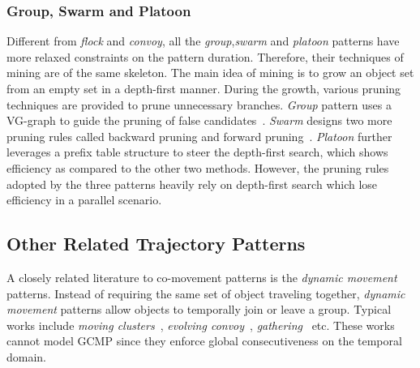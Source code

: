 \subsubsection{Group, Swarm and Platoon}
Different from \emph{flock} and \emph{convoy}, all the \emph{group},\emph{swarm} and \emph{platoon}
patterns have more relaxed constraints on the pattern duration. Therefore, their techniques of mining are of
the same skeleton. The main idea of mining is to grow an object set from an empty set
in a depth-first manner. During the growth, various pruning techniques are provided to prune 
unnecessary branches. \emph{Group} pattern uses a VG-graph to guide the pruning of false candidates~\cite{wang2006grouppattern}.
\emph{Swarm} designs two more pruning rules called backward pruning and forward pruning~\cite{li2010swarm}. \emph{Platoon}
further leverages a prefix table structure to steer the depth-first search, which shows efficiency 
as compared to the other two methods.
However, the pruning rules adopted by the three patterns heavily rely on depth-first search which lose efficiency in a parallel scenario.

\subsection{Other Related Trajectory Patterns}
A closely related literature to co-movement patterns is the \emph{dynamic movement} patterns. Instead of requiring the same set of object traveling together, \emph{dynamic movement} patterns allow objects to temporally join or leave a group. Typical works include \emph{moving clusters}~\cite{kalnis2005movingclusters}, \emph{evolving convoy}~\cite{aung2010discovery}, \emph{gathering}~\cite{zheng2013gathering} etc. These works cannot model GCMP since they enforce global consecutiveness on the 
temporal domain.


